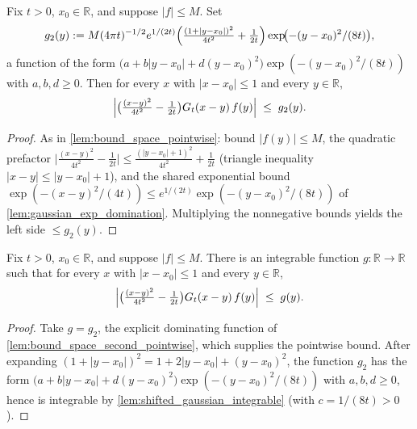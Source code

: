 \begin{lemma}
    \label{lem:bound_space_second_pointwise}
    \leanok
    Fix $t > 0$, $x_0 \in \mathbb{R}$, and suppose $\lvert f\rvert \le M$. Set
    \[ g_2(y) := M(4\pi t)^{-1/2} e^{1/(2t)}
        \Bigl(\tfrac{(1+\lvert y-x_0\rvert)^2}{4t^2} + \tfrac{1}{2t}\Bigr)
        \exp\!\bigl(-(y-x_0)^2/(8t)\bigr), \]
    a function of the form $\bigl(a + b\lvert y-x_0\rvert + d(y-x_0)^2\bigr)
    \exp(-(y-x_0)^2/(8t))$ with $a,b,d \ge 0$. Then for every $x$ with
    $\lvert x - x_0\rvert \le 1$ and every $y \in \mathbb{R}$,
    \[ \Bigl\lvert \bigl(\tfrac{(x-y)^2}{4t^2} - \tfrac{1}{2t}\bigr)
        G_t(x-y)\, f(y)\Bigr\rvert \;\le\; g_2(y). \]
\end{lemma}
\begin{proof}
    As in \cref{lem:bound_space_pointwise}: bound $\lvert f(y)\rvert \le M$, the
    quadratic prefactor $\bigl\lvert\tfrac{(x-y)^2}{4t^2} - \tfrac{1}{2t}\bigr\rvert
    \le \tfrac{(\lvert y-x_0\rvert+1)^2}{4t^2} + \tfrac{1}{2t}$ (triangle inequality
    $\lvert x-y\rvert \le \lvert y-x_0\rvert+1$), and the shared exponential bound
    $\exp(-(x-y)^2/(4t)) \le e^{1/(2t)}\exp(-(y-x_0)^2/(8t))$ of
    \cref{lem:gaussian_exp_domination}. Multiplying the nonnegative bounds yields the
    left side $\le g_2(y)$.
\end{proof}

\begin{lemma}
    \label{lem:bound_space_second}
    \leanok
    Fix $t > 0$, $x_0 \in \mathbb{R}$, and suppose $\lvert f\rvert \le M$. There is an
    integrable function $g : \mathbb{R} \to \mathbb{R}$ such that for every $x$ with
    $\lvert x - x_0\rvert \le 1$ and every $y \in \mathbb{R}$,
    \[ \Bigl\lvert \bigl(\tfrac{(x-y)^2}{4t^2} - \tfrac{1}{2t}\bigr)
        G_t(x-y)\, f(y)\Bigr\rvert \;\le\; g(y). \]
\end{lemma}
\begin{proof}
    Take $g = g_2$, the explicit dominating function of
    \cref{lem:bound_space_second_pointwise}, which supplies the pointwise bound. After
    expanding $(1+\lvert y-x_0\rvert)^2 = 1 + 2\lvert y-x_0\rvert + (y-x_0)^2$, the
    function $g_2$ has the form $\bigl(a + b\lvert y-x_0\rvert + d(y-x_0)^2\bigr)
    \exp(-(y-x_0)^2/(8t))$ with $a,b,d \ge 0$, hence is integrable by
    \cref{lem:shifted_gaussian_integrable} (with $c = 1/(8t) > 0$).
\end{proof}

